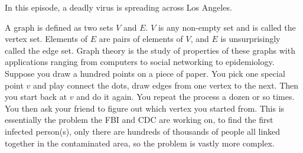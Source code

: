 \newpage
{}
{}

In this episode, a deadly virus is spreading across Los Angeles. 



A graph is defined as two sets $V$ and $E$. $V$ is any non-empty set and is called the vertex set. Elements of $E$ are pairs of elements of $V$, and $E$ is unsurprisingly called the edge set. Graph theory is the study of properties of these graphs with applications ranging from computers to social networking to epidemiology. Suppose you draw a hundred points on a piece of paper. You pick one special point $v$ and play connect the dots, draw edges from one vertex to the next. Then you start back at $v$ and do it again. You repeat the process a dozen or so times. You then ask your friend to figure out which vertex you started from. This is essentially the problem the FBI and CDC are working on, to find the first infected person(s), only there are hundreds of thousands of people all linked together in the contaminated area, so the problem is vastly more complex.



